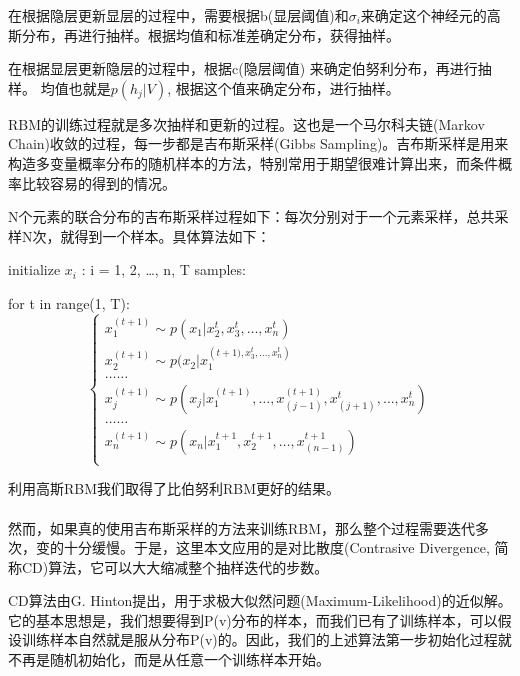 	在根据隐层更新显层的过程中，需要根据b(显层阈值)和$\sigma_i$来确定这个神经元的高斯分布，再进行抽样。根据均值和标准差确定分布，获得抽样。
	
	在根据显层更新隐层的过程中，根据c(隐层阈值) 来确定伯努利分布，再进行抽样。 均值也就是$p(h_j| V)$, 根据这个值来确定分布，进行抽样。
	
	RBM的训练过程就是多次抽样和更新的过程。这也是一个马尔科夫链(Markov Chain)收敛的过程，每一步都是吉布斯采样(Gibbs Sampling)。吉布斯采样是用来构造多变量概率分布的随机样本的方法，特别常用于期望很难计算出来，而条件概率比较容易的得到的情况。
	
	N个元素的联合分布的吉布斯采样过程如下：每次分别对于一个元素采样，总共采样N次，就得到一个样本。具体算法如下：
	
	initialize $x_i$ : i = 1, 2, …, n, T samples:
	
	for t in range(1, T):\\
	\begin{equation}
	\begin{cases}
		x_1^{(t+1)} \sim p(x_1 | x_2^t, x_3^t,…, x_n^t)\\
		x_2^{(t+1)} \sim p(x_2 | x_1^({t+1)}, x_3^t,…, x_n^t)\\
		……\\
		x_j^{(t+1)} \sim p(x_j | x_1^{(t+1)},…,x_{(j-1)}^{(t+1)},x_{(j+1)}^t,…, x_n^t)\\
		……\\
		x_n^{(t+1)} \sim p(x_n | x_1^{t+1}, x_2^{t+1},…, x_{(n-1)}^{t+1})\\
	\end{cases}
	\end{equation}
	
	利用高斯RBM我们取得了比伯努利RBM更好的结果。
	\\
	\\
	然而，如果真的使用吉布斯采样的方法来训练RBM，那么整个过程需要迭代多次，变的十分缓慢。于是，这里本文应用的是对比散度(Contrasive Divergence, 简称CD)算法，它可以大大缩减整个抽样迭代的步数。
	
	CD算法由G. Hinton提出，用于求极大似然问题(Maximum-Likelihood)的近似解。它的基本思想是，我们想要得到P(v)分布的样本，而我们已有了训练样本，可以假设训练样本自然就是服从分布P(v)的。因此，我们的上述算法第一步初始化过程就不再是随机初始化，而是从任意一个训练样本开始。
	
